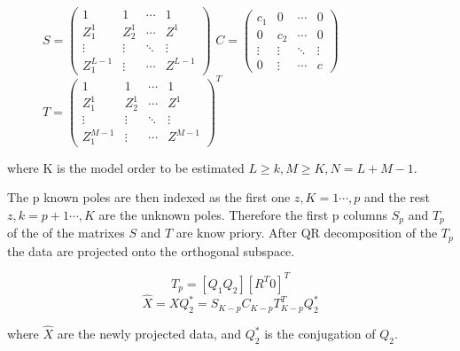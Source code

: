 \begin{figure}[!htbp]
%
\centering
$S= 
 \begin{pmatrix}
  1 & 1 & \cdots & 1 \\
  Z_{1}^{1} & Z_{2}^{1} & \cdots &   Z^{1} \\
  \vdots  & \vdots  & \ddots & \vdots  \\
  Z_{1}^{L-1} & \vdots & \cdots & Z^{L-1} 
 \end{pmatrix}$
\endminipage\hfill
{}%
\centering
 $C= 
 \begin{pmatrix}
  c_{1} & 0 & \cdots & 0 \\
  0 & c_{2}& \cdots &   0 \\
  \vdots  & \vdots  & \ddots & \vdots  \\
  0 & \vdots & \cdots & c 
 \end{pmatrix}$
\endminipage\hfill
{}%
\centering
$T= 
 \begin{pmatrix}
  1 & 1 & \cdots & 1 \\
  Z_{1}^{1} & Z_{2}^{1} & \cdots &   Z^{1} \\
  \vdots  & \vdots  & \ddots & \vdots  \\
  Z_{1}^{M-1} & \vdots & \cdots & Z^{M-1} 
 \end{pmatrix}^{T}$
\endminipage\hfill
\end{figure}
 where K is the model order to be estimated $L\geq k,M\geq K, N=L+M-1$.
 
 The p known poles are then indexed as the first one $z,K=1\cdots ,p$ and the rest $z, k=p+1\cdots ,K$ are the unknown poles. Therefore the first p columns $S_{p}$ and $T_{p}$ of the of the matrixes $S$ and $T$ are know priory. After QR decomposition of the $T_{p}$ the data are projected onto the orthogonal subspace.
 
 \begin{figure}[!htbp]
%
\centering
 \begin{equation}
 T_{p}=[Q_{1} Q_{2}][R^{T} 0]^{T}
 \end{equation}
\endminipage\hfill
{}%
\centering
 \begin{equation}
 \hat{X}=XQ_{2}^{*}=S_{K-p}C_{K-p}T_{K-p}^{T}Q_{2}^{*}
 \end{equation}
\endminipage\hfill
\end{figure}


 
 

 
 where $ \hat{X}$ are the newly projected data, and $Q_{2}^{*}$ is the conjugation of $Q_{2}$. 
 
